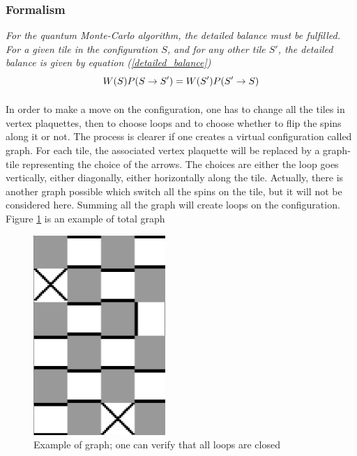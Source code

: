 \documentclass[a4paper,12pt,twoside]{article}
\begin{document}
	\subsubsection{Formalism}
	\emph{For the quantum Monte-Carlo algorithm, the detailed balance must be fulfilled. For a given tile in the configuration $S$, and for any other tile $S'$, the detailed balance is given by equation (\ref{detailed_balance})}
	\begin{equation}
		\centering
		W(S)P(S\rightarrow S') = W(S')P(S'\rightarrow S)
		\label{detailed_balance}
	\end{equation}
	
	\paragraph{}
	In order to make a move on the configuration, one has to change all the tiles in vertex plaquettes, then to choose loops and to choose whether to flip the spins along it or not. The process is clearer if one creates a virtual configuration called graph. For each tile, the associated vertex plaquette will be replaced by a graph-tile representing the choice of the arrows. The choices are either the loop goes vertically, either diagonally, either horizontally along the tile. Actually, there is another graph possible which switch all the spins on the tile, but it will not be considered here. Summing all the graph will create loops on the configuration. Figure \ref{graph_example} is an example of total graph
	\begin{figure}[!h]
		 \centering
		 \includegraphics[width = 5cm]{random_graph.png}
		 \caption{Example of graph; one can verify that all loops are closed}
		 \label{graph_example}
	\end{figure}
\end{document}
